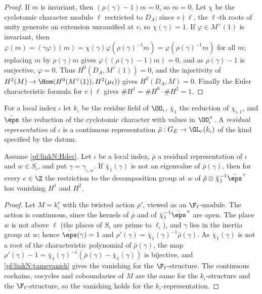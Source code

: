\begin{proof}
If $m$ is invariant, then $(\rho(\gamma)-1)m=0$, so $m=0$. Let $\chi$ be the cyclotomic character modulo $\ell$ restricted to $D_A$;
since $v\nmid\ell$, the $\ell$-th roots of unity generate an extension unramified at $v$, so $\chi(\gamma)=1$. If $\varphi\in M^\vee(1)$
is invariant, then $\varphi(m)=(\gamma\varphi)(m)=\chi(\gamma)\varphi(\rho(\gamma)^{-1}m)=\varphi(\rho(\gamma)^{-1}m)$ for all $m$;
replacing $m$ by $\rho(\gamma)m$ gives $\varphi((\rho(\gamma)-1)m)=0$, and as $\rho(\gamma)-1$ is surjective, $\varphi=0$. Thus
$H^0(D_A,M^\vee(1))=0$, and the injectivity of $H^2(M)\to\Hom(H^0(M^\vee(1)),H^2(\mu_\ell))$ gives $H^2(D_A,M)=0$. Finally the Euler
characteristic formula for $v\nmid\ell$ gives $\#H^1=\#H^0\cdot\#H^2=1$.
\end{proof}

For a local index $\iota$ let $k_\iota$ be the residue field of $\OO_\iota$, $\bar\chi_1$ the reduction of $\chi_{\iota,1}$, and $\bar\eps$
the reduction of the cyclotomic character with values in $\OO_\iota^\times$. A \emph{residual representation} of $\iota$ is a
continuous representation $\bar\rho:G_E\to\GL_r(k_\iota)$ of the kind specified by the datum.

\begin{lemma}\label{pf:linkN:h12}
Assume \cref{pf:linkN:Hdec}. Let $\iota$ be a local index, $\bar\rho$ a residual representation of $\iota$ and $w\in S_\iota$, and put
$\gamma=\gamma_{\iota,w}$. If $\bar\chi_1(\gamma)$ is not an eigenvalue of $\bar\rho(\gamma)$, then for every $e\in\Z$ the restriction to
the decomposition group at $w$ of $\bar\rho\otimes\bar\chi_1^{-1}\bar\eps^{\,e}$ has vanishing $H^1$ and $H^2$.
\end{lemma}

\begin{proof}
Let $M=k_\iota^r$ with the twisted action $\rho'$, viewed as an $\F_\ell$-module. The action is continuous, since the kernels of
$\bar\rho$ and of $\bar\chi_1^{-1}\bar\eps^{\,e}$ are open. The place $w$ is not above $\ell$ (the places of $S_\iota$ are prime to
$\ell_\iota$), and $\gamma$ lies in the inertia group at $w$; hence $\bar\eps(\gamma)=1$ and $\rho'(\gamma)=\bar\chi_1(\gamma)^{-1}\bar\rho(\gamma)$.
As $\bar\chi_1(\gamma)$ is not a root of the characteristic polynomial of $\bar\rho(\gamma)$, the map
$\rho'(\gamma)-1=\bar\chi_1(\gamma)^{-1}(\bar\rho(\gamma)-\bar\chi_1(\gamma))$ is bijective, and \cref{pf:linkN:tamevanish} gives the
vanishing for the $\F_\ell$-structure. The continuous cochains, cocycles and coboundaries of $M$ are the same for the
$k_\iota$-structure and the $\F_\ell$-structure, so the vanishing holds for the $k_\iota$-representation.
\end{proof}

